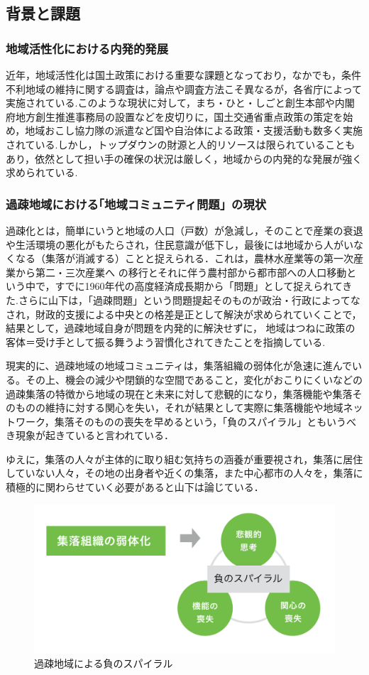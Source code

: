 \documentclass[a4paper]{jsarticle}
\begin{document}
\subsection{背景と課題}
\subsubsection{地域活性化における内発的発展}
近年，地域活性化は国土政策における重要な課題となっており，なかでも，条件不利地域の維持に関する調査は，論点や調査方法こそ異なるが，各省庁によって実施されている.このような現状に対して，まち・ひと・しごと創生本部や内閣府地方創生推進事務局の設置などを皮切りに，国土交通省重点政策\cite{2}の策定を始め，地域おこし協力隊の派遣など国や自治体による政策・支援活動も数多く実施されている.しかし，トップダウンの財源と人的リソースは限られていることもあり，依然として担い手の確保の状況は厳しく，地域からの内発的な発展が強く求められている.
\subsubsection{過疎地域における｢地域コミュニティ問題」の現状}
過疎化とは，簡単にいうと地域の人口（戸数）が急減し，そのことで産業の衰退や生活環境の悪化がもたらされ，住民意識が低下し，最後には地域から人がいなくなる（集落が消滅する）ことと捉えられる．\cite{3}これは，農林水産業等の第一次産業から第二・三次産業へ の移行とそれに伴う農村部から都市部への人口移動という中で，すでに1960年代の高度経済成長期から「問題」として捉えられてきた.\cite{4}さらに山下は，「過疎問題」という問題提起そのものが政治・行政によってなされ，財政的支援による中央との格差是正として解決が求められていくことで，結果として，過疎地域自身が問題を内発的に解決せずに， 地域はつねに政策の客体＝受け手として振る舞うよう習慣化されてきたことを指摘している.\cite{5}\par
現実的に、過疎地域の地域コミュニティは，集落組織の弱体化が急速に進んでいる。その上、機会の減少や閉鎖的な空間であること，変化がおこりにくいなどの過疎集落の特徴から地域の現在と未来に対して悲観的になり，集落機能や集落そのものの維持に対する関心を失い，それが結果として実際に集落機能や地域ネットワーク，集落そのものの喪失を早めるという，「負のスパイラル」ともいうべき現象が起きていると言われている．\cite{6}\par
ゆえに，集落の人々が主体的に取り組む気持ちの涵養が重要視され，集落に居住していない人々，その地の出身者や近くの集落，また中心都市の人々を，集落に積極的に関わらせていく必要があると山下は論じている．\cite{7}

\begin{figure}[H]
  \begin{center}
    \includegraphics[width=0.7\hsize]{./images/17.png}
    \caption{過疎地域による負のスパイラル}
    \label{fig:tmu_hino}
  \end{center}
\end{figure}
\end{document}
